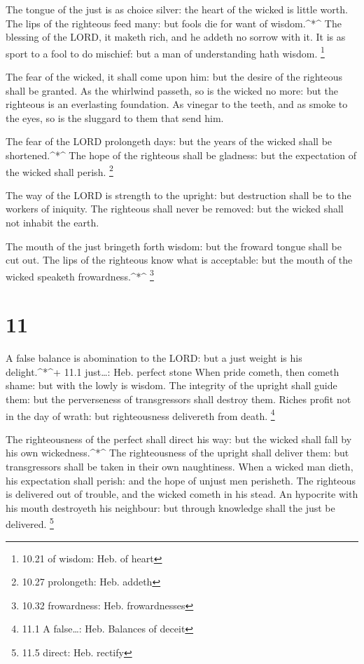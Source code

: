  The tongue of the just is as choice silver: the heart of
the wicked is little worth.  The lips of the righteous feed
many: but fools die for want of wisdom.\^{}*\^{}  The
blessing of the LORD, it maketh rich, and he addeth no sorrow with it.
 It is as sport to a fool to do mischief: but a man of
understanding hath wisdom. \footnote{10.21 of wisdom: Heb. of heart}

 The fear of the wicked, it shall come upon him: but the
desire of the righteous shall be granted.  As the whirlwind
passeth, so is the wicked no more: but the righteous is an everlasting
foundation.  As vinegar to the teeth, and as smoke to the
eyes, so is the sluggard to them that send him.

 The fear of the LORD prolongeth days: but the years of the
wicked shall be shortened.\^{}*\^{}  The hope of the
righteous shall be gladness: but the expectation of the wicked shall
perish. \footnote{10.27 prolongeth: Heb. addeth}

 The way of the LORD is strength to the upright: but
destruction shall be to the workers of iniquity.  The
righteous shall never be removed: but the wicked shall not inhabit the
earth.

 The mouth of the just bringeth forth wisdom: but the
froward tongue shall be cut out.  The lips of the righteous
know what is acceptable: but the mouth of the wicked speaketh
frowardness.\^{}*\^{} \footnote{10.32 frowardness: Heb. frowardnesses}

\hypertarget{section-10}{%
\section{11}\label{section-10}}

 A false balance is abomination to the LORD: but a just
weight is his delight.\^{}*\^{}+ 11.1 just\ldots: Heb. perfect stone
 When pride cometh, then cometh shame: but with the lowly is
wisdom.  The integrity of the upright shall guide them: but
the perverseness of transgressors shall destroy them. 
Riches profit not in the day of wrath: but righteousness delivereth from
death. \footnote{11.1 A false\ldots: Heb. Balances of deceit}

 The righteousness of the perfect shall direct his way: but
the wicked shall fall by his own wickedness.\^{}*\^{}  The
righteousness of the upright shall deliver them: but transgressors shall
be taken in their own naughtiness.  When a wicked man dieth,
his expectation shall perish: and the hope of unjust men perisheth.
 The righteous is delivered out of trouble, and the wicked
cometh in his stead.  An hypocrite with his mouth destroyeth
his neighbour: but through knowledge shall the just be delivered.
\footnote{11.5 direct: Heb. rectify}

